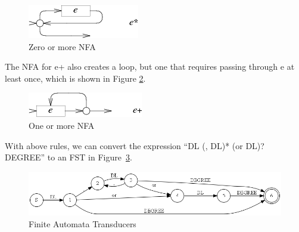 \begin{figure}[htbp]
  \centering
  \includegraphics[scale=1]{images/star.png}
  \caption{Zero or more NFA}
  \label{fig:nfa_star}
\end{figure}

The NFA for e+ also creates a loop, but one that requires passing through e at least once, which is shown in Figure \ref{fig:nfa_plus}.
\begin{figure}[htbp]
  \centering
  \includegraphics[scale=1]{images/plus.png}
  \caption{One or more NFA}
  \label{fig:nfa_plus}
\end{figure}

With above rules, we can convert the expression ``DL (, DL)*  (or DL)? DEGREE'' to an FST in Figure~\ref{fig:fst_pattern}.

\begin{figure}[htbp]
  \centering
  \includegraphics[scale=0.6]{images/test_tokenre2_6.png}
  \caption{Finite Automata Transducers}
  \label{fig:fst_pattern}
\end{figure}
